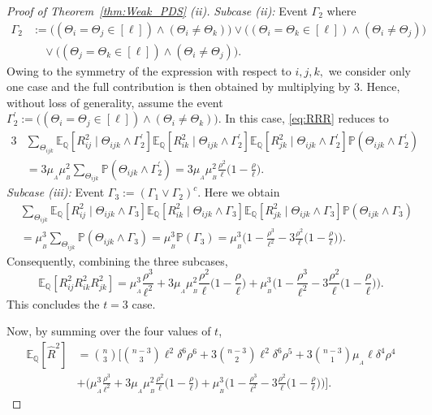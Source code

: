 \documentclass[11pt, letterpaper]{article}
\numberwithin{equation}{section}
\begin{document}
\begin{proof}[Proof of Theorem~\ref{thm:Weak_PDS} \textnormal{(ii)}]
\noindent \emph{Subcase (ii):} Event $\Gamma_2$ where \begin{align*}
     \Gamma_2 &:= \Big((\Theta_i = \Theta_j \in [\ell]) \wedge
(\Theta_i \neq \Theta_k)\Big) \vee \Big((\Theta_i = \Theta_k \in [\ell]) \wedge
(\Theta_i \neq \Theta_j)\Big)\\
& \quad \vee \Big((\Theta_j = \Theta_k \in [\ell]) \wedge
(\Theta_i \neq \Theta_j)\Big).
\end{align*} 
Owing to the symmetry of the expression with respect to $i, j, k,$ we consider only one case and the full contribution is then obtained by multiplying by 3. Hence, without loss of generality, assume the event $\Gamma_2^{\prime} := \Big((\Theta_i = \Theta_j \in [\ell]) \wedge
(\Theta_i \neq \Theta_k)\Big)$. In this case, \eqref{eq:RRR} reduces to
\begin{align*}
    3&\sum_{\Theta_{ijk}}\mathbb{E}_{\mathbb Q}[R_{ij}^2 \mid \Theta_{ijk} \wedge \Gamma_2^{\prime}]
   \mathbb{E}_{\mathbb Q}[R_{ik}^2 \mid \Theta_{ijk} \wedge \Gamma_2^{\prime}]
   \mathbb{E}_{\mathbb Q}[R_{jk}^2 \mid \Theta_{ijk} \wedge \Gamma_2^{\prime}]\mathbb P(\Theta_{ijk} \wedge \Gamma_2^{\prime})\\
    &= 3\mu_{_A}\mu_{_B}^2\sum_{\Theta_{ijk}}\mathbb P(\Theta_{ijk} \wedge \Gamma_2^{\prime})= 3\mu_{_A}\mu_{_B}^2 \frac{\rho^2}{\ell}\Big(1-\frac{\rho}{\ell}\Big).
\end{align*}
\noindent \emph{Subcase (iii):} Event $\Gamma_3 := (\Gamma_1 \vee \Gamma_2)^c$.
Here we obtain
\begin{align*}
    &\sum_{\Theta_{ijk}}\mathbb{E}_{\mathbb Q}[R_{ij}^2 \mid \Theta_{ijk} \wedge \Gamma_3]
   \mathbb{E}_{\mathbb Q}[R_{ik}^2 \mid \Theta_{ijk} \wedge \Gamma_3]
   \mathbb{E}_{\mathbb Q}[R_{jk}^2 \mid \Theta_{ijk} \wedge \Gamma_3]\mathbb P(\Theta_{ijk} \wedge \Gamma_3)\\
    &= \mu_{_B}^3 \sum_{\Theta_{ijk}} \mathbb P(\Theta_{ijk} \wedge \Gamma_3)= \mu_{_B}^3  \mathbb P(\Gamma_3)= \mu_{_B}^3\Big(1 - \frac{\rho^3}{\ell^2} 
    - 3 \frac{\rho^2}{\ell}\Big(1-\frac{\rho}{\ell}\Big)\Big).
\end{align*}
\noindent Consequently, combining the three subcases,
\[
   \mathbb{E}_{\mathbb Q}[R_{ij}^2 R_{ik}^2 R_{jk}^2] = \mu_{_A}^3 \frac{\rho^3}{\ell^2} 
    + 3\mu_{_A}\mu_{_B}^2 \frac{\rho^2}{\ell}\Big(1-\frac{\rho}{\ell}\Big)
    + \mu_{_B}^3\Big(1 - \frac{\rho^3}{\ell^2} 
    - 3 \frac{\rho^2}{\ell}\Big(1-\frac{\rho}{\ell}\Big)\Big).
\]
This concludes the $t=3$ case.

\noindent Now, by summing over the four values of $t$,
\begin{align*}
\mathbb{E}_{\mathbb Q}[\widehat{R}^2]
&= \binom{n}{3}\Bigg[\binom{n-3}{3}\ell^{2}\delta^6\rho^6+ 3\binom{n-3}{2}\ell^{2} \delta^6 \rho^5+ 3\binom{n-3}{1} \mu_{_A}\ell\delta^4 \rho^4 \\
    &+ \Bigg(\mu_{_A}^3 \frac{\rho^3}{\ell^2}
    + 3\mu_{_A}\mu_{_B}^2 \frac{\rho^2}{\ell}\Big(1-\frac{\rho}{\ell}\Big)+ \mu_{_B}^3\Big(1 -\frac{\rho^3}{\ell^2} 
    - 3\frac{\rho^2}{\ell}\Big(1-\frac{\rho}{\ell}\Big)\Bigg)\Bigg].
\end{align*}


\end{proof}
\end{document}
